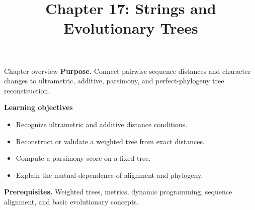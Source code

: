 \documentclass[11pt,letterpaper]{article}
\title{Chapter 17: Strings and Evolutionary Trees}
\author{}
\date{}
\begin{document}
\maketitle

\begin{CornellOverviewBox}{Chapter overview}
\textbf{Purpose.} Connect pairwise sequence distances and character changes to ultrametric, additive, parsimony, and perfect-phylogeny tree reconstruction.

\textbf{Learning objectives}
\begin{itemize}
  \item Recognize ultrametric and additive distance conditions.
  \item Reconstruct or validate a weighted tree from exact distances.
  \item Compute a parsimony score on a fixed tree.
  \item Explain the mutual dependence of alignment and phylogeny.
\end{itemize}

\textbf{Prerequisites.} Weighted trees, metrics, dynamic programming, sequence alignment, and basic evolutionary concepts.
\end{CornellOverviewBox}
\end{document}
